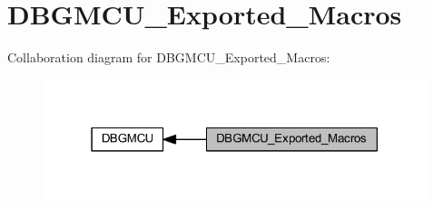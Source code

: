 \hypertarget{group___d_b_g_m_c_u___exported___macros}{}\section{D\+B\+G\+M\+C\+U\+\_\+\+Exported\+\_\+\+Macros}
\label{group___d_b_g_m_c_u___exported___macros}
Collaboration diagram for D\+B\+G\+M\+C\+U\+\_\+\+Exported\+\_\+\+Macros\+:
\nopagebreak
\begin{figure}[H]
\begin{center}
\leavevmode
\includegraphics[width=316pt]{group___d_b_g_m_c_u___exported___macros}
\end{center}
\end{figure}
